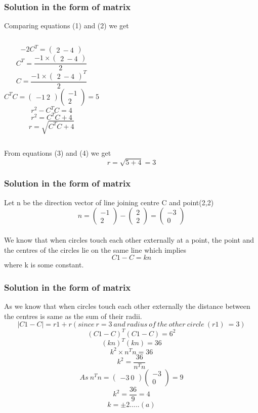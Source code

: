 \documentclass{beamer}
\begin{document}
\begin{frame}
\frametitle{Solution in the form of matrix}
Comparing equations (1) and (2) we get
\begin{columns}
$$ -2C^T = \begin{pmatrix}2\ -4 \end{pmatrix}$$
$$ C^T = \frac{-1\times \begin{pmatrix}2\ -4 \end{pmatrix}}{2} $$
 $$C = \frac{-1\times \begin{pmatrix}2\ -4 \end{pmatrix}^T}{2} $$
\begin{equation}
C^TC = \begin{pmatrix}-1\ 2 \end{pmatrix} \begin{pmatrix}-1\\ 2 \end{pmatrix}  = 5
\end{equation}
$$r^2-C^TC = 4 $$
$$r^2 = C^TC + 4 $$
\begin{equation}
 r = \sqrt{C^TC + 4} 
\end{equation}
\end{columns}
From equations (3) and (4) we get 
$$ r = \sqrt{ 5 + 4 } = 3 $$
\end{frame}

\begin{frame}
\frametitle{Solution in the form of matrix}
Let n be the direction vector of line joining centre C and point(2,2)$$n = \begin{pmatrix}-1\\ 2 \end{pmatrix} - \begin{pmatrix}2\\ 2 \end{pmatrix} = \begin{pmatrix}-3\\ 0 \end{pmatrix}$$\\
We know that when circles touch each other externally at a point, the point and the centres of the circles lie on the same line which implies $$C1 - C = kn $$ where k is some constant.
\end{frame}

\begin{frame}
\frametitle{Solution in the form of matrix}
As we know that when circles touch each other externally the distance between the centres is same as the sum of their radii.
$$|C1 - C| = r1 + r  (since \ r = 3\ and \ radius \ of\ the\ other\ circle\ (r1)\ = 3) $$
$$( C1 - C )^T( C1- C ) = 6^2 $$
$$ (kn)^T(kn) = 36 $$
$$k^2 \times n^Tn = 36 $$
$$ k^2 = \frac{36}{n^Tn} $$
$$ As\ n^Tn = \begin{pmatrix}-3\ 0 \end{pmatrix} \begin{pmatrix}-3\\ 0 \end{pmatrix} = 9 $$
$$ k^2 = \frac{36}{9} = 4 $$
$$ k = \pm 2  ..... (a)$$
\end{frame}
\end{document}
